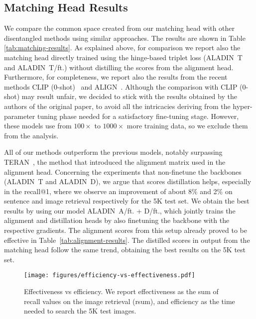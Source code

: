 \documentclass[sigconf]{acmart}
\newcommand{\ourmodel}{ALADIN}    \settopmatter{authorsperrow=4}
\begin{document}
\subsection{Matching Head Results}
We compare the common space created from our matching head with other disentangled methods using similar approaches. The results are shown in Table \ref{tab:matching-results}. As explained above, for comparison we report also the matching head directly trained using the hinge-based triplet loss (\ourmodel\ T and \ourmodel\ T/ft.) without distilling the scores from the alignment head. Furthermore, for completeness, we report also the results from the recent methods CLIP (0-shot)~\citep{radford2021learning} and ALIGN~\citep{jia2021scaling}. Although the comparison with CLIP (0-shot) may result unfair, we decided to stick with the results obtained by the authors of the original paper, to avoid all the intricacies deriving from the hyper-parameter tuning phase needed for a satisfactory fine-tuning stage. However, these models use from $100\times$ to $1000\times$ more training data, so we exclude them from the analysis.

All of our methods outperform the previous models, notably surpassing TERAN~\citep{messina2021fine}, the method that introduced the alignment matrix used in the alignment head. Concerning the experiments that non-finetune the backbones (\ourmodel\ T and \ourmodel\ D), we argue that scores distillation helps, especially in the recall@1, where we observe an improvement of about 8\% and 2\% on sentence and image retrieval respectively for the 5K test set. 
We obtain the best results by using our model \ourmodel\ A/ft. + D/ft., which jointly trains the alignment and distillation heads by also finetuning the backbone with the respective gradients. The alignment scores from this setup already proved to be effective in Table~\ref{tab:alignment-results}. The distilled scores in output from the matching head follow the same trend, obtaining the best results on the 5K test set.

\begin{figure}[t]
  \centering
  \texttt{[image: figures/efficiency-vs-effectiveness.pdf]}
  \caption{Effectiveness vs efficiency. We report effectiveness as the sum of recall values on the image retrieval (rsum), and efficiency as the time needed to search the 5K test images.}
  \label{fig:effectiveness-vs-efficiency}
\end{figure}
\end{document}
